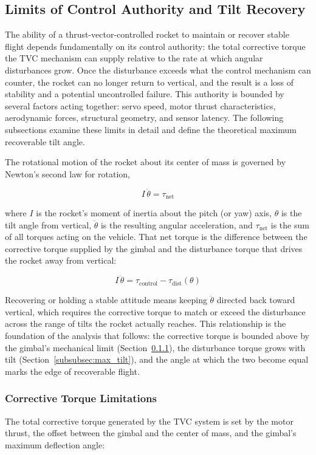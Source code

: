 \subsection{Limits of Control Authority and Tilt Recovery}
\label{subsec:authority}

The ability of a thrust-vector-controlled rocket to maintain or recover stable flight depends fundamentally on its control authority: the total corrective torque the TVC mechanism can supply relative to the rate at which angular disturbances grow. Once the disturbance exceeds what the control mechanism can counter, the rocket can no longer return to vertical, and the result is a loss of stability and a potential uncontrolled failure. This authority is bounded by several factors acting together: servo speed, motor thrust characteristics, aerodynamic forces, structural geometry, and sensor latency. The following subsections examine these limits in detail and define the theoretical maximum recoverable tilt angle.

The rotational motion of the rocket about its center of mass is governed by Newton's second law for rotation,

\[
I\,\ddot{\theta} = \tau_{\mathrm{net}}
\]

where $I$ is the rocket's moment of inertia about the pitch (or yaw) axis, $\theta$ is the tilt angle from vertical, $\ddot{\theta}$ is the resulting angular acceleration, and $\tau_{\mathrm{net}}$ is the sum of all torques acting on the vehicle. That net torque is the difference between the corrective torque supplied by the gimbal and the disturbance torque that drives the rocket away from vertical:

\[
I\,\ddot{\theta} = \tau_{\mathrm{control}} - \tau_{\mathrm{dist}}(\theta)
\]

Recovering or holding a stable attitude means keeping $\ddot{\theta}$ directed back toward vertical, which requires the corrective torque to match or exceed the disturbance across the range of tilts the rocket actually reaches. This relationship is the foundation of the analysis that follows: the corrective torque is bounded above by the gimbal's mechanical limit (Section~\ref{subsubsec:torque_limit}), the disturbance torque grows with tilt (Section~\ref{subsubsec:max_tilt}), and the angle at which the two become equal marks the edge of recoverable flight.

\subsubsection{Corrective Torque Limitations}
\label{subsubsec:torque_limit}
The total corrective torque generated by the TVC system is set by the motor thrust, the offset between the gimbal and the center of mass, and the gimbal's maximum deflection angle:

